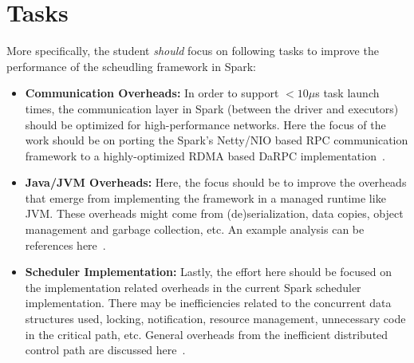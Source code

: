 \documentclass[10pt,a4paper]{article}
\begin{document}
% 
% 
% 
% 

\section*{Tasks}

More specifically, the student \textit{should} focus on following tasks to
improve the performance of the scheudling framework in Spark:

\begin{itemize}
  \item \textbf{Communication Overheads:} In order to support $<10\mu$s 
  task launch times, the communication layer in Spark (between the
  driver and executors) should be optimized for high-performance
  networks. Here the focus of the work should be on porting the Spark's
  Netty/NIO based RPC communication framework to a highly-optimized RDMA
  based DaRPC implementation~\cite{2018-github-darpc,2014-socc-darpc}.

\item \textbf{Java/JVM Overheads:} Here, the focus should be to improve the 
overheads that emerge from implementing the framework in a managed runtime 
like JVM. These overheads might come from (de)serialization, data copies, 
object management and garbage collection, etc. An example analysis can 
be references here~\cite{2016-osdi-warmjvm}.  
  
\item \textbf{Scheduler Implementation:} Lastly, the effort here should be
focused on the implementation related overheads in the current Spark scheduler
implementation. There may be inefficiencies related to the concurrent 
data structures used, locking, notification, resource management, 
unnecessary code in the critical path, etc. General overheads from the 
inefficient distributed control path are discussed here~\cite{2017-atc-nimbus}.    
\end{itemize}
\end{document}

